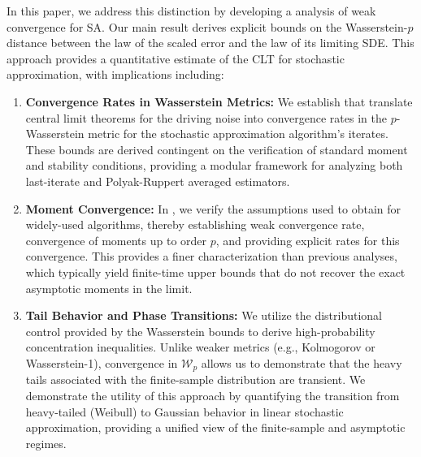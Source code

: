 \documentclass[11pt]{article}
\begin{document}
In this paper, we address this distinction by developing a \nonasymptotic analysis of weak convergence for SA. 
Our main result derives explicit bounds on the Wasserstein-$p$ distance between the law of the scaled error and the law of its limiting SDE. 
This approach provides a quantitative estimate of the CLT for stochastic approximation, with implications including: 







\begin{enumerate}
    \item 
    \textbf{Convergence Rates in Wasserstein Metrics:}
    We establish  that translate \nonasymptotic central limit theorems for the driving noise into convergence rates in the $p$-Wasserstein metric for the stochastic approximation algorithm's iterates. 
    These bounds are derived contingent on the verification of standard moment and stability conditions, providing a modular framework for analyzing both last-iterate and Polyak-Ruppert averaged estimators. 
    

    \item 
    \textbf{Moment Convergence:}
    In , we verify  the assumptions used to obtain  for widely-used algorithms, thereby establishing weak convergence rate, convergence of moments up to order $p$, and providing explicit rates for this convergence. 
    This provides a finer characterization than previous \nonasymptotic analyses, which typically yield finite-time upper bounds that do not recover the exact asymptotic moments in the limit.     
    
    \item 
    \textbf{Tail Behavior and Phase Transitions:}
    We utilize the distributional control provided by the Wasserstein bounds to derive high-probability concentration inequalities. 
    Unlike weaker metrics (e.g., Kolmogorov or Wasserstein-1), convergence in $\mathcal{W}_p$ allows us to demonstrate that the heavy tails associated with the finite-sample distribution are transient. 
    We demonstrate the utility of this approach by quantifying the transition from heavy-tailed (Weibull) to Gaussian behavior in linear stochastic approximation, providing a unified view of the finite-sample and asymptotic regimes. 
    


\end{enumerate}
\end{document}
